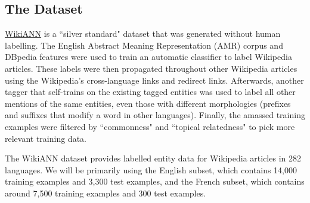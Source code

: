 \documentclass[11pt,addpoints,answers]{exam}
\begin{document}
\subsection{The Dataset}\label{dataset}
\href{https://aclanthology.org/P17-1178.pdf}{WikiANN} is a ``silver standard" dataset that was generated without human labelling. The English Abstract Meaning Representation (AMR) corpus and DBpedia features were used to train an automatic classifier to label Wikipedia articles. These labels were then propagated throughout other Wikipedia articles using the Wikipedia's cross-language links and redirect links. Afterwards, another tagger that self-trains on the existing tagged entities was used to label all other mentions of the same entities, even those with different morphologies (prefixes and suffixes that modify a word in other languages). Finally, the amassed training examples were filtered by ``commonness" and ``topical relatedness" to pick more relevant training data. 

The WikiANN dataset provides labelled entity data for Wikipedia articles in 282 languages. We will be primarily using the English subset, which contains 14,000 training examples and 3,300 test examples, and the French subset, which contains around 7,500 training examples and 300 test examples. 

\clearpage
\end{document}
